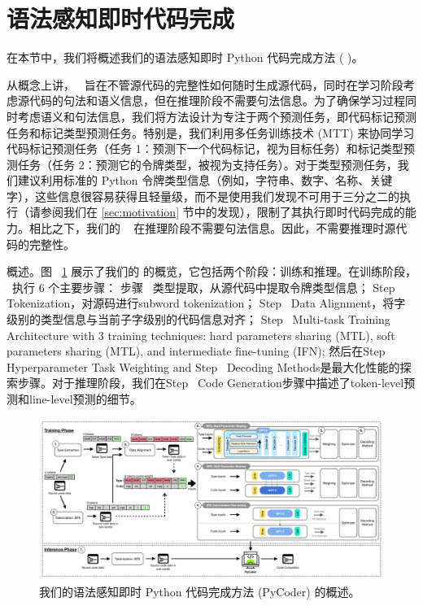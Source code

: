 \documentclass[UTF8]{article}
\begin{document}
   \section{语法感知即时代码完成}       \label{sec:approach}   

在本节中，我们将概述我们的语法感知即时 Python 代码完成方法 (   \our   )。

从概念上讲，   \our    ~旨在不管源代码的完整性如何随时生成源代码，同时在学习阶段考虑源代码的句法和语义信息，但在推理阶段不需要句法信息。为了确保学习过程同时考虑语义和句法信息，我们将方法设计为专注于两个预测任务，即代码标记预测任务和标记类型预测任务。特别是，我们利用多任务训练技术 (MTT) 来协同学习代码标记预测任务（任务 1：预测下一个代码标记，视为目标任务）和标记类型预测任务（任务 2：预测它的令牌类型，被视为支持任务）。对于类型预测任务，我们建议利用标准的 Python 令牌类型信息（例如，字符串、数字、名称、关键字），这些信息很容易获得且轻量级，而不是使用我们发现不可用于三分之二的执行（请参阅我们在    \ref{sec:motivation}    节中的发现），限制了其执行即时代码完成的能力。相比之下，我们的    \our    ~ 在推理阶段不需要句法信息。因此，不需要推理时源代码的完整性。

概述。图~    \ref{fig:overview}    展示了我们的    \our    的概览，它包括两个阶段：训练和推理。在训练阶段，   \our    ~执行 6 个主要步骤： 步骤~        类型提取，从源代码中提取令牌类型信息； Step~        Tokenization，对源码进行subword tokenization； Step~        Data Alignment，将字级别的类型信息与当前子字级别的代码信息对齐； Step~        Multi-task Training Architecture with 3 training techniques: hard parameters sharing (MTL), soft parameters sharing (MTL), and intermediate fine-tuning (IFN); 然后在Step~        Hyperparameter Task Weighting and Step~        Decoding Methods是最大化性能的探索步骤。对于推理阶段，我们在Step~       Code Generation步骤中描述了token-level预测和line-level预测的细节。

   \begin{figure}
    \centering
    \includegraphics[width=\textwidth]{figures/overview.pdf}
    \caption{我们的语法感知即时 Python 代码完成方法 (PyCoder) 的概述。}
    \label{fig:overview}
\end{figure}   
\end{document}
